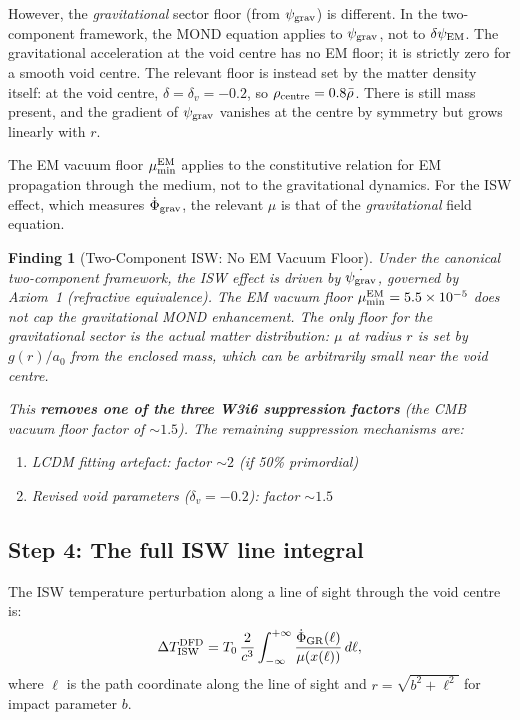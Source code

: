 \documentclass[11pt]{article}
\newtheorem{finding}{Finding}
\newcommand{\ee}[1]{\times 10^{#1}}
\newcommand{\psigrav}{\psi_{\rm grav}}
\newcommand{\dpsiEM}{\delta\psi_{\rm EM}}
\newcommand{\aM}{a_0}
\newcommand{\mufd}{\mu}
\newcommand{\mumin}{\mu_{\rm min}}
\begin{document}
However, the \emph{gravitational} sector floor (from $\psigrav$) is
different. In the two-component framework, the MOND equation applies
to $\psigrav$, not to $\dpsiEM$. The gravitational acceleration at the
void centre has no EM floor; it is strictly zero for a smooth void
centre. The relevant floor is instead set by the matter density itself:
at the void centre, $\delta = \delta_v = -0.2$, so $\rho_{\rm centre}
= 0.8\bar{\rho}$. There is still mass present, and
the gradient of $\psigrav$ vanishes at the centre by symmetry but grows
linearly with $r$.

The EM vacuum floor $\mumin^{\rm EM}$ applies to the constitutive
relation for EM propagation through the medium, not to the gravitational
dynamics. For the ISW effect, which measures $\dot{\Phi}_{\rm grav}$,
the relevant $\mufd$ is that of the \emph{gravitational} field equation.

\begin{finding}[Two-Component ISW: No EM Vacuum Floor]
\label{find:no-EM-floor}
Under the canonical two-component framework, the ISW effect is driven
by $\dot{\psigrav}$, governed by Axiom~1 (refractive equivalence).
The EM vacuum floor $\mumin^{\rm EM} = 5.5\ee{-5}$ does \emph{not}
cap the gravitational MOND enhancement. The only floor for the
gravitational sector is the actual matter distribution: $\mufd$ at
radius $r$ is set by $g(r)/\aM$ from the enclosed mass, which can be
arbitrarily small near the void centre.

This \textbf{removes one of the three W3i6 suppression factors}
(the CMB vacuum floor factor of $\sim 1.5$). The remaining
suppression mechanisms are:
\begin{enumerate}[nosep]
\item LCDM fitting artefact: factor $\sim 2$ (if 50\% primordial)
\item Revised void parameters ($\delta_v = -0.2$): factor $\sim 1.5$
\end{enumerate}
\end{finding}

\subsection{Step 4: The full ISW line integral}

The ISW temperature perturbation along a line of sight through the
void centre is:
\begin{equation}
\Delta T_{\rm ISW}^{\rm DFD}
= T_0\,\frac{2}{c^3}\int_{-\infty}^{+\infty}
\frac{\dot{\Phi}_{\rm GR}(\ell)}{\mufd(x(\ell))}\,d\ell,
\label{eq:ISW-full}
\end{equation}
where $\ell$ is the path coordinate along the line of sight and
$r = \sqrt{b^2 + \ell^2}$ for impact parameter $b$.
\end{document}
